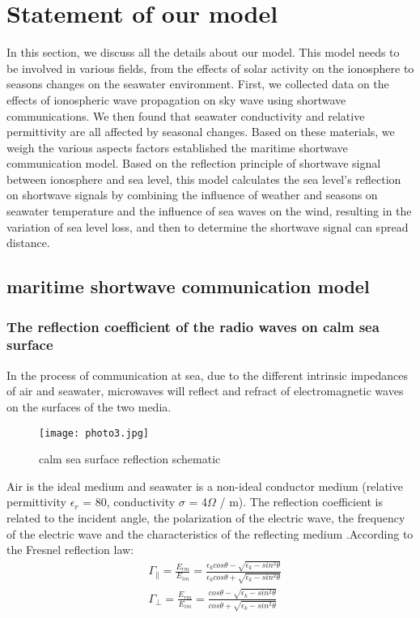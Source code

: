 \documentclass{mcmthesis}
\begin{document}
\section{ Statement of our model}
In this section, we discuss all the details about our model. This model needs to be involved in various fields, from the effects of solar activity on the ionosphere to seasons changes on the seawater environment. First, we collected data on the effects of ionospheric wave propagation on sky wave using shortwave communications. We then found that seawater conductivity and relative permittivity are all affected by seasonal changes. Based on these materials, we weigh the various aspects factors established the maritime shortwave communication model. Based on the reflection principle of shortwave signal between ionosphere and sea level, this model calculates the sea level's reflection on shortwave signals by combining the influence of weather and seasons on seawater temperature and the influence of sea waves on the wind, resulting in the variation of sea level loss, and then to determine the shortwave signal can spread distance.
\subsection{maritime shortwave communication model}%

\subsubsection{The reflection coefficient of the radio waves on calm sea surface}%
In the process of communication at sea, due to the different intrinsic impedances of air and seawater, microwaves will reflect and refract of electromagnetic waves on the surfaces of the two media.
\begin{figure}[h]
\small
\centering
\texttt{[image: photo3.jpg]}
\caption{calm sea surface reflection schematic} \label{fig:aa}
\end{figure}
Air is the ideal medium and seawater is a non-ideal conductor medium (relative permittivity $\epsilon_{r}$ = 80, conductivity $\sigma$ = 4$\Omega$ / m). The reflection coefficient is related to the incident angle, the polarization of the electric wave, the frequency of the electric wave and the characteristics of the reflecting medium .According to the Fresnel reflection law:
\begin{eqnarray}
&\Gamma_\parallel=\frac{E_{rm}}{E_{im}}=\frac{\epsilon_kcos\theta-\sqrt{\epsilon_k-sin^2\theta}}{\epsilon_kcos\theta+\sqrt{\epsilon_k-sin^2\theta}}\\
&\Gamma_\perp=\frac{E_{rm}}{E_{im}}=\frac{cos\theta-\sqrt{\epsilon_k-sin^2\theta}}{cos\theta+\sqrt{\epsilon_k-sin^2\theta}}
\end{eqnarray}
\end{document}
